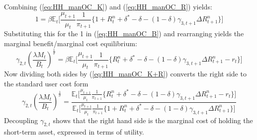 \documentclass[11pt,a4paper,margin=1.5in]{article}
\begin{document}
Combining (\ref{eq:HH_manOC_K}) and (\ref{eq:HH_manOC_R}) yields:
\begin{equation}
	1 = \beta\mathbb{E}_t \Bigg[ \frac{\mu_{t+1}}{\mu_{t}}\frac{1}{\pi_{t+1}} \Big\{ 1 + R^n_t + \delta^* - \delta - (1-\delta)\gamma_{3,t+1}\Delta R^n_{t+1}\Big\}\Bigg]
	\label{eq:HH_manOC_K+R}
\end{equation}
Substituting this for the 1 in (\ref{eq:HH_manOC_B}) and rearranging yields the marginal benefit/marginal cost equilibrium:
\begin{equation}
	\gamma_{2,t}\left(\frac{\lambda M_t}{B_t}\right)^\frac{1}{\sigma} = \beta\mathbb{E}_t \Bigg[ \frac{\mu_{t+1}}{\mu_{t}}\frac{1}{\pi_{t+1}} \Big\{ R^n_t + \delta^* - \delta - (1-\delta)\gamma_{3,t+1}\Delta R^n_{t+1} - r_t \Big\}\Bigg]
\end{equation}
Now dividing both sides by (\ref{eq:HH_manOC_K+R}) converts the right side to the standard user cost form
\begin{equation}
	\gamma_{2,t}\left(\frac{\lambda M_t}{B_t}\right)^\frac{1}{\sigma} = \frac{\mathbb{E}_t \Big[ \frac{\mu_{t+1}}{\mu_{t}}\frac{1}{\pi_{t+1}} \Big\{ R^n_t + \delta^* - \delta - (1-\delta)\gamma_{3,t+1}\Delta R^n_{t+1} - r_t \Big\}\Big]}{\mathbb{E}_t \Big[ \frac{\mu_{t+1}}{\mu_{t}}\frac{1}{\pi_{t+1}} \Big\{ 1+ R^n_t + \delta^* - \delta - (1-\delta)\gamma_{3,t+1}\Delta R^n_{t+1}\Big\}\Big]}
	\label{eq:HH_manOC_usercost}
\end{equation}
Decoupling $\gamma_{2,t}$ shows that the right hand side is the marginal cost of holding the short-term asset, expressed in terms of utility.
\end{document}
